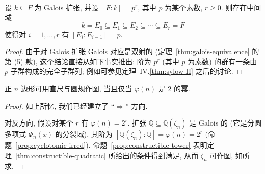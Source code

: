\begin{proposition}\label{prop:constructible-tower}
设 $k\subseteq F$ 为 Galois 扩张, 并设 $[F:k]=p^r$, 其中 $p$ 为某个素数, $r\ge 0$. 则存在中间域
\[
k=E_0\subseteq E_1\subseteq E_2\subseteq\cdots\subseteq E_r=F
\]
使得对 $i=1,\ldots,r$ 有 $[E_i:E_{i-1}]=p$.
\end{proposition}

\begin{proof}
由于对 Galois 扩张 Galois 对应是双射的 (定理~\ref{thm:galois-equivalence} 的第 (5) 款), 这个结论直接从如下事实推出: 阶为 $p^r$ (其中 $p$ 为素数) 的群有一条由 $p$-子群构成的完全子群列; 例如可参见定理~IV.\ref{thm:sylow-II} 之后的讨论.
\end{proof}

\begin{theorem}\label{thm:regular-n-gon}
正 $n$ 边形可用直尺与圆规作图, 当且仅当 $\varphi(n)$ 是 $2$ 的幂.
\end{theorem}

\begin{proof}
如上所忆, 我们已经建立了 ``$\Longrightarrow$'' 方向.

对反方向, 假设对某个 $r$ 有 $\varphi(n)=2^r$. 扩张 $\mathbb{Q}\subseteq\mathbb{Q}(\zeta_n)$ 是 Galois 的 (它是分圆多项式 $\Phi_n(x)$ 的分裂域), 其阶为 $[\mathbb{Q}(\zeta_n):\mathbb{Q}]=\varphi(n)=2^r$ (命题~\ref{prop:cyclotomic-irred}). 命题~\ref{prop:constructible-tower} 表明定理~\ref{thm:constructible-quadratic} 所给出的条件得到满足, 从而 $\zeta_n$ 可作图, 如所求.
\end{proof}

